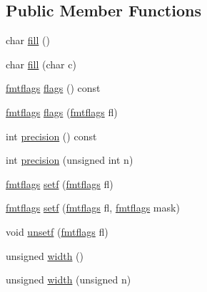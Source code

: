 \subsection*{Public Member Functions}
\begin{DoxyCompactItemize}
\item 
char \hyperlink{classios__base_ade5bd46462e075999c3a5c2cff2015f1}{fill} ()
\item 
char \hyperlink{classios__base_aa5683f9bdf295311bd5a6d3cdc2fedd5}{fill} (char c)
\item 
\hyperlink{classios__base_ac9a54e52cef4f01ac0afd8ae896a3413}{fmtflags} \hyperlink{classios__base_ab5e9c7dbcbc33b7de9dcb70525ec7384}{flags} () const 
\item 
\hyperlink{classios__base_ac9a54e52cef4f01ac0afd8ae896a3413}{fmtflags} \hyperlink{classios__base_ae67e900dc12e4c7cbc0741ad1c70d6c2}{flags} (\hyperlink{classios__base_ac9a54e52cef4f01ac0afd8ae896a3413}{fmtflags} fl)
\item 
int \hyperlink{classios__base_a9d36cb5a859b74e04f640d2f5e53b41d}{precision} () const 
\item 
int \hyperlink{classios__base_a5b70cc65fc2c276136fea99bddedb6f0}{precision} (unsigned int n)
\item 
\hyperlink{classios__base_ac9a54e52cef4f01ac0afd8ae896a3413}{fmtflags} \hyperlink{classios__base_ab5db835cb45bba7684ebf72d9a3cccb4}{setf} (\hyperlink{classios__base_ac9a54e52cef4f01ac0afd8ae896a3413}{fmtflags} fl)
\item 
\hyperlink{classios__base_ac9a54e52cef4f01ac0afd8ae896a3413}{fmtflags} \hyperlink{classios__base_a74dbc93607ab7d68a87ec326b92b6c81}{setf} (\hyperlink{classios__base_ac9a54e52cef4f01ac0afd8ae896a3413}{fmtflags} fl, \hyperlink{classios__base_ac9a54e52cef4f01ac0afd8ae896a3413}{fmtflags} mask)
\item 
void \hyperlink{classios__base_a3bf7d054a433ed15e8b984e16f630fa4}{unsetf} (\hyperlink{classios__base_ac9a54e52cef4f01ac0afd8ae896a3413}{fmtflags} fl)
\item 
unsigned \hyperlink{classios__base_afa30e7644b4eae5928ad9c487ad387de}{width} ()
\item 
unsigned \hyperlink{classios__base_ab2ba0f005bbf3d8ebed93b64068492e0}{width} (unsigned n)
\end{DoxyCompactItemize}

